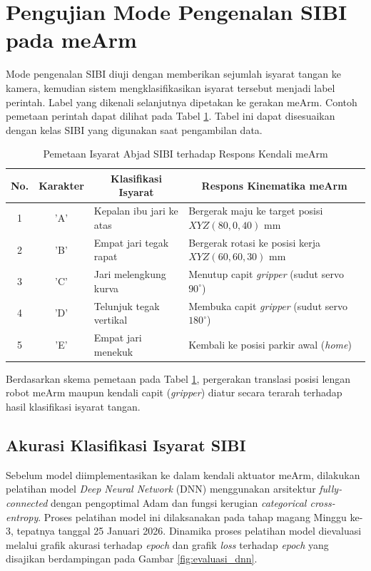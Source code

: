 \section{Pengujian Mode Pengenalan SIBI pada meArm}
Mode pengenalan SIBI diuji dengan memberikan sejumlah isyarat tangan ke kamera, kemudian sistem mengklasifikasikan isyarat tersebut menjadi label perintah. Label yang dikenali selanjutnya dipetakan ke gerakan meArm. Contoh pemetaan perintah dapat dilihat pada Tabel \ref{tab:pemetaan_sibi}. Tabel ini dapat disesuaikan dengan kelas SIBI yang digunakan saat pengambilan data.

\begin{table}[htbp]
\centering
\caption{Pemetaan Isyarat Abjad SIBI terhadap Respons Kendali meArm}
\label{tab:pemetaan_sibi}
\begin{tabular}{|c|c|p{4.5cm}|p{5.5cm}|}
\hline
\textbf{No.} & \textbf{Karakter} & \multicolumn{1}{c|}{\textbf{Klasifikasi Isyarat}} & \multicolumn{1}{c|}{\textbf{Respons Kinematika meArm}} \\ \hline
1 & 'A' & Kepalan ibu jari ke atas & Bergerak maju ke target posisi $XYZ(80, 0, 40)$ mm \\ \hline
2 & 'B' & Empat jari tegak rapat & Bergerak rotasi ke posisi kerja $XYZ(60, 60, 30)$ mm \\ \hline
3 & 'C' & Jari melengkung kurva & Menutup capit \textit{gripper} (sudut servo $90^\circ$) \\ \hline
4 & 'D' & Telunjuk tegak vertikal & Membuka capit \textit{gripper} (sudut servo $180^\circ$) \\ \hline
5 & 'E' & Empat jari menekuk & Kembali ke posisi parkir awal (\textit{home}) \\ \hline
\end{tabular}
\end{table}

Berdasarkan skema pemetaan pada Tabel \ref{tab:pemetaan_sibi}, pergerakan translasi posisi lengan robot meArm maupun kendali capit (\textit{gripper}) diatur secara terarah terhadap hasil klasifikasi isyarat tangan.

\subsection{Akurasi Klasifikasi Isyarat SIBI}
Sebelum model diimplementasikan ke dalam kendali aktuator meArm, dilakukan pelatihan model \textit{Deep Neural Network} (DNN) menggunakan arsitektur \textit{fully-connected} dengan pengoptimal Adam dan fungsi kerugian \textit{categorical cross-entropy}. Proses pelatihan model ini dilaksanakan pada tahap magang Minggu ke-3, tepatnya tanggal 25 Januari 2026. Dinamika proses pelatihan model dievaluasi melalui grafik akurasi terhadap \textit{epoch} dan grafik \textit{loss} terhadap \textit{epoch} yang disajikan berdampingan pada Gambar \ref{fig:evaluasi_dnn}.

